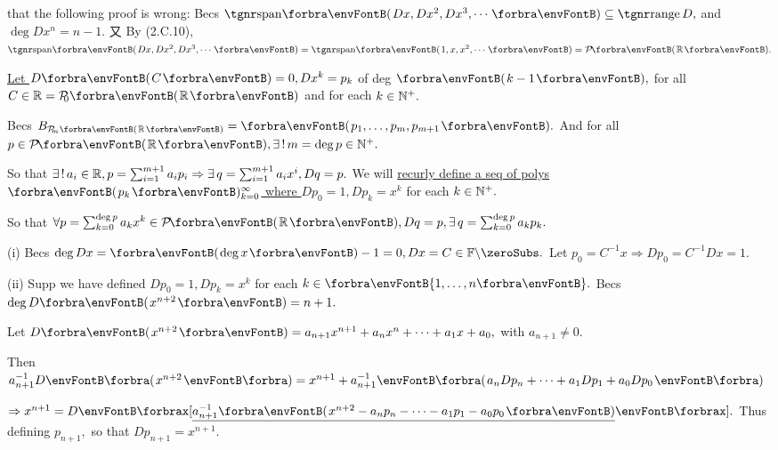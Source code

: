 \! \;\NOTICE that the following proof is wrong:\parSol{}
Becs $\Span{Dx,Dx^2,Dx^3,\cdots}\subseteq\range D,$ and $\deg Dx^n=n-1.$\parSol{}
又 By (2.C.10), $\Span{Dx,Dx^2,Dx^3,\cdots}=\Span{1,x,x^2,\cdots}=\PoRi.$\par\vspace{4pt}\quad
\uline{Let $D\Par{C}=0,Dx^k=p_k$} of deg $\Par{k-1},$ for all $C\in\Rbb=\PoR{0}$ and for each $k\in{\mathbb{N}^+}.$\par\quad
Becs $B_{\PoR[\SmallPar]{m}}=\Par{p_1,\dots,p_m,p_{m+1}}.$ And for all $p\in\PoRi,\exists\,!\,m=\deg p\in\Nbp.$\par\quad
So that $\exists\,!\,a_i\in{\mathbb{R}},p=\sum_{i=1}^{m+1}a_ip_i\Rightarrow\exists\,q=\sum_{i=1}^{m+1}a_{i}x^{i},Dq=p.$\PfEnd\vspace{6pt}\quad
{\Or We will \uline{recurly define a seq of polys $\Par{p_k}{_{k=0}^\infty}$ where $Dp_0=1,Dp_k=x^k$} for each $k\in{\mathbb{N}^+}.$}\par\vspace{2pt}\quad
{\FontSmall So that $\forall p=\sum_{k=0}^{\deg p}a_k x^k\in\PoRi,Dq=p,\exists\,q={\sum_{k=0}^{\deg p}a_k p_k}.$}\par\vspace{4pt}\quad
(i) {Becs $\deg Dx=\Par{\!\deg x}-1=0,Dx=C\in\nonzeroFbb.$ Let $p_0=C^{-1}x\Rightarrow Dp_0=C^{-1}Dx=1.$}\vspace{2pt}\par\quad\Endi
(ii) {Supp we have defined $Dp_0=1,Dp_k=x^k$ for each $k\in\Bra{1,\dots,n}.$ Becs $\deg D\Par{x^{n+2}}=n+1.$}\vspace{2pt}\par\quad\Hii
{Let {\;$D\Par{x^{n+2}}=a_{n+1}x^{n+1}+a_n x^n+\dots+a_1 x+a_0,$} with $a_{n+1}\neq 0.$}\vspace{2pt}\par\quad\Hii
{Then {\;$a_{n+1}^{-1}D\BigPar{x^{n+2}}=x^{n+1}+a_{n+1}^{-1}\BigPar{a_n Dp_n+\dots+a_1 Dp_1 +a_0 Dp_0}$}}\vspace{2pt}\par\quad\Hii
{$\Rightarrow x^{n+1}=D\XSbra{\uline{a_{n+1}^{-1}\Par{x^{n+2}-a_n p_n-\dots-a_1 p_1-a_0 p_0}}}.$ Thus defining $p_{n+1},$ so that $Dp_{n+1}=x^{n+1}.$}\PfEnd
\SepLine

